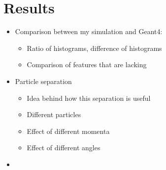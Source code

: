 
\chapter{Results}
\label{ch:Results}
\begin{itemize}
\item Comparison between my simulation and Geant4: 
	\begin{itemize}
	\item Ratio of histograms, difference of histograms
	\item Comparison of features that are lacking
	\end{itemize}
\item Particle separation
	\begin{itemize}
	\item Idea behind how this separation is useful
	\item Different particles
	\item Effect of different momenta
	\item Effect of different angles
	\end{itemize}
\item
\end{itemize}
\endinput

Any text after an \endinput is ignored.
You could put scraps here or things in progress.
